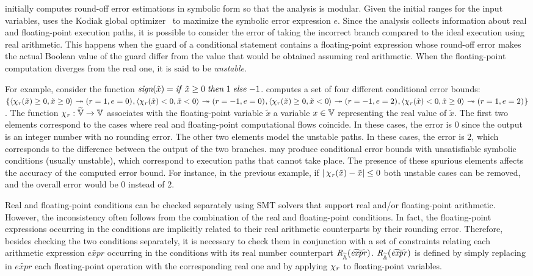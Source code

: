 \documentclass[runningheads,american,orivec,fleqn]{llncs}
\begin{document}
\tool{} initially computes round-off error estimations in symbolic form so that the analysis is modular.
%
Given the initial ranges for the input variables, \tool{} uses the Kodiak global optimizer~\cite{NarkawiczM13} to maximize the symbolic error expression $e$.
% 
Since the analysis collects information about real and floating-point execution paths, it is possible to consider the error of taking the incorrect branch compared to the ideal execution using real arithmetic.
This happens when the guard of a conditional statement contains a floating-point expression whose round-off error makes the actual Boolean value of the guard differ from the value that would
be obtained assuming real arithmetic.
%
When the floating-point computation diverges from the real one, it is said to be \emph{unstable}.

For example, consider the function $\textit{sign}(\tilde{x}) = \; \mathrel{\mathit{if}} \tilde{x} \geq 0 \mathrel{\mathit{then}} 1 \mathrel{\mathit{else}} -1$.
%
\tool{} computes a set of four different conditional error bounds: 
$\{
\cerr{\real{\tilde{x}} \geq 0}{\tilde{x} \geq 0}{r=1}{e=0}{}{},
\cerr{\real{\tilde{x}} < 0}{\tilde{x} < 0}{r=-1}{e=0}{}{},
\cerr{\real{\tilde{x}} \geq 0}{\tilde{x} < 0}{r=-1}{e=2}{}{},
\cerr{\real{\tilde{x}} < 0}{\tilde{x} \geq 0}{r=1}{e=2}{}{}
\}$.
%
The function $\real{}: \FVar \ra \Var$ associates with the floating-point variable $\tilde{x}$ a variable $x \in \mathbb{V}$ representing the real value of $\tilde{x}$.
% 
The first two elements correspond to the cases where real and floating-point computational flows coincide. In these cases, the error is 0 since the output is an integer number with no rounding error.
%
The other two elements model the unstable paths. In these cases, the
error is $2$, which corresponds to the difference between the output of the two branches.
%
\tool{} may produce conditional error bounds with unsatisfiable
symbolic conditions (usually unstable), which correspond to execution paths that cannot take place.
%
The presence of these spurious elements
affects the accuracy of the computed error bound.
%
For instance, in the previous example, if $|\real{\tilde{x}} - \tilde{x}| \leq 0$ both unstable cases can be removed, and the overall error would be $0$ instead of $2$.
%

Real and floating-point conditions can be checked separately using SMT solvers that support real and/or floating-point arithmetic.
%
However, the inconsistency often follows from the combination of the real and floating-point conditions.
%
In fact, the floating-point expressions occurring in the conditions are implicitly related to their real arithmetic counterparts by their rounding error.
%
Therefore, besides checking the two conditions separately, it is necessary to check them in conjunction with a set of constraints relating each arithmetic expression $\widetilde{\mathit{expr}}$ occurring in the conditions with its real number counterpart $\FtoRA{\widetilde{\mathit{expr}}}$. 
% 
$\FtoRA{\widetilde{\mathit{expr}}}$ is defined by simply replacing in $\widetilde{\mathit{expr}}$ each floating-point operation with the corresponding real one and by applying $\real{}$ to floating-point variables.
\end{document}
